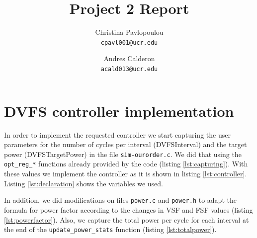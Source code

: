 \documentclass[10pt]{scrartcl}
\title{Project 2 Report}
\author{
   Christina Pavlopoulou\\
  \small \texttt{cpavl001@ucr.edu}
  \and
   Andres Calderon\\
  \small \texttt{acald013@ucr.edu}
}
\begin{document}
\maketitle

\section{DVFS controller implementation}
In order to implement the requested controller we start capturing the user parameters for the number of cycles per interval (DVFSInterval) and the target power (DVFSTargetPower) in the file \texttt{sim-ourorder.c}.  We did that using the \texttt{opt\_reg\_*} functions already provided by the code (listing \ref{lst:capturing}).  With these values we implement the controller as it is shown in listing \ref{lst:controller}.  Listing \ref{lst:declaration} shows the variables we used.

In addition, we did modifications on files \texttt{power.c} and \texttt{power.h} to adapt the formula for power factor according to the changes in VSF and FSF values (listing \ref{lst:powerfactor}).  Also, we capture the total power per cycle for each interval at the end of the \texttt{update\_power\_stats} function (listing \ref{lst:totalpower}).





\end{document}
